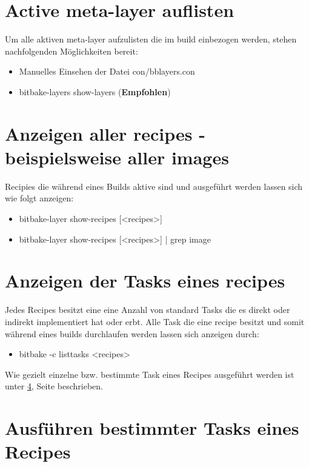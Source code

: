 \section{Active meta-layer auflisten}%
\label{sec:active_meta_layer_auflisten}
Um alle aktiven meta-layer aufzulisten die im build einbezogen werden, stehen
nachfolgenden Möglichkeiten bereit:

\begin{itemize}
    \item Manuelles Einsehen der Datei con/bblayers.con
    \item bitbake-layers show-layers (\textbf{Empfohlen})
\end{itemize}


\section{Anzeigen aller recipes - beispielsweise aller images}%
\label{sec:anzeigen_aller_recipes}
Recipies die während eines Builds aktive sind und ausgeführt werden lassen sich
wie folgt anzeigen:

\begin{itemize}
    \item bitbake-layer show-recipes [<recipes>]
    \item bitbake-layer show-recipes [<recipes>] | grep image
\end{itemize}


\section{Anzeigen der Tasks eines recipes}%
\label{sec:anzeigen_der_tasks_eines_recipes}
Jedes Recipes besitzt eine eine Anzahl von standard Tasks die es direkt oder
indirekt implementiert hat oder erbt.
Alle Task die eine recipe besitzt und somit während eines builds
durchlaufen werden lassen sich anzeigen durch:

\begin{itemize}
    \item bitbake -c listtasks <recipes>
\end{itemize}

Wie gezielt einzelne bzw. bestimmte Task eines Recipes ausgeführt werden ist
unter \ref{sec:ausfuhren_bestimmter_tasks_eines_recipies}, Seite
\pageref{sec:ausfuhren_bestimmter_tasks_eines_recipies} beschrieben.

\section{Ausführen bestimmter Tasks eines Recipes}%
\label{sec:ausfuhren_bestimmter_tasks_eines_recipies}

